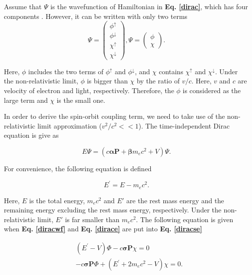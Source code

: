 \documentclass[a4paper, 12pt, titlepage,oneside,drop]{kthesis}
\begin{document}
\noindent  Assume that $\Psi$ is the wavefunction of Hamiltonian in \textbf{Eq. \ref{dirac}}, which has four components \cite{thaller1992dirac, dirac1930principles}. However, it can be 
written with only two terms
\begin{equation}\label{diracwf}
\Psi = \left( \begin{array}{c}
\phi^{\uparrow} \\
\phi^{\downarrow} \\
\chi^{\uparrow} \\
\chi^{\downarrow} \end{array} \right),
 \Psi = \left(\begin{array}{c}
\phi \\               
\chi \end{array} \right).
\end{equation}

\noindent Here, $\phi$ includes the two terms of $\phi^{\uparrow}$ and $\phi^{\downarrow}$, and $\chi$ contains  $\chi^{\uparrow}$ and $\chi^{\downarrow}$.
Under the non-relativistic limit, $\phi$ is bigger than $\chi$ by the ratio of $v/c$. Here, $v$ and $c$ are velocity of electron and light, respectively.
Therefore, the $\phi$ is considered as the large term and $\chi$ is the small one.

\noindent In order to derive the spin-orbit coupling term, we need to take use of the non-relativistic limit approximation ($v^2/c^2 << 1$). The time-independent Dirac equation is give as

\begin{equation}\label{diracse}
 E \Psi = (c \boldsymbol{\alpha} \textbf{P} + \boldsymbol{\beta}m_ec^{2} + V) \Psi.
\end{equation}

\noindent For convenience, the following equation is defined

\begin{equation}\label{dirace}
E^{\prime} = E - m_ec^2.
\end{equation}

\noindent Here, $E$ is the total energy, $m_ec^2$ and $E'$ are the rest mass energy and the remaining energy excluding the rest mass energy, respectively. Under the non-relativistic limit, 
$E'$ is far smaller than $m_ec^2$. The following equation is given when \textbf{Eq. \ref{diracwf}} and \textbf{Eq. \ref{dirace}} are put into \textbf{Eq. \ref{diracse}}

\begin{equation}
\begin{split}
&(E^{\prime} - V) \Phi - c \boldsymbol{\sigma} \textbf{P} \chi = 0\\                
&-c\boldsymbol{\sigma} \textbf{P} \Phi + (E^{\prime}+2m_ec^2-V)\chi = 0.
\end{split}
\end{equation}
\end{document}
